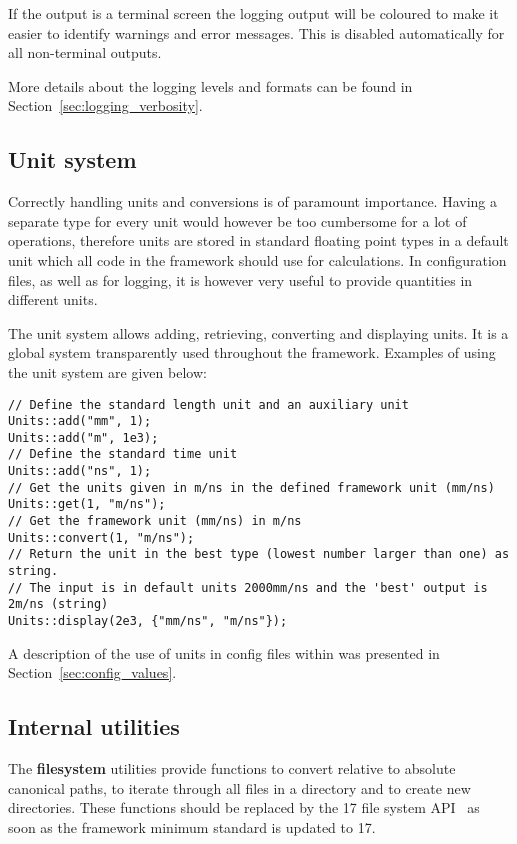 If the output is a terminal screen the logging output will be coloured to make it easier to identify warnings and error messages.
This is disabled automatically for all non-terminal outputs.

More details about the logging levels and formats can be found in Section~\ref{sec:logging_verbosity}.

\subsection{Unit system}
\label{sec:unit_system}
Correctly handling units and conversions is of paramount importance.
Having a separate \CPP type for every unit would however be too cumbersome for a lot of operations, therefore units are stored in standard \CPP floating point types in a default unit which all code in the framework should use for calculations.
In configuration files, as well as for logging, it is however very useful to provide quantities in different units.

The unit system allows adding, retrieving, converting and displaying units.
It is a global system transparently used throughout the framework.
Examples of using the unit system are given below:
\begin{verbatim}
// Define the standard length unit and an auxiliary unit
Units::add("mm", 1);
Units::add("m", 1e3);
// Define the standard time unit
Units::add("ns", 1);
// Get the units given in m/ns in the defined framework unit (mm/ns)
Units::get(1, "m/ns");
// Get the framework unit (mm/ns) in m/ns
Units::convert(1, "m/ns");
// Return the unit in the best type (lowest number larger than one) as string.
// The input is in default units 2000mm/ns and the 'best' output is 2m/ns (string)
Units::display(2e3, {"mm/ns", "m/ns"});
\end{verbatim}

A description of the use of units in config files within \apsq was presented in Section~\ref{sec:config_values}.

\subsection{Internal utilities}
\label{sec:filesystem}
The \textbf{filesystem} utilities provide functions to convert relative to absolute canonical paths, to iterate through all files in a directory and to create new directories.
These functions should be replaced by the {\CPP}17 file system API~\cite{cppfilesystem} as soon as the framework minimum standard is updated to {\CPP}17.

